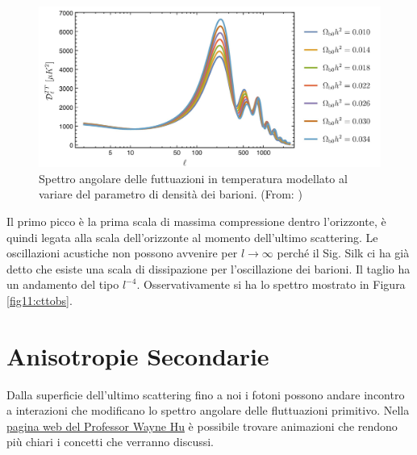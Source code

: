 \begin{figure}[H]
    \centering
    \includegraphics[width=.8 \textwidth]{Pictures/11/angspecmodel.jpg}
    \caption{Spettro angolare delle futtuazioni in temperatura modellato al variare del parametro di densità dei barioni. (From: \cite{Piattella_2018}) }\label{fig11:cttmodelb}
\end{figure}

Il primo picco è la prima scala di massima compressione dentro l'orizzonte, è quindi legata alla scala dell'orizzonte al momento dell'ultimo scattering. Le oscillazioni acustiche non possono avvenire per $l\to \infty$ perché il Sig. Silk ci ha già detto che esiste una scala di dissipazione per l'oscillazione dei barioni. Il taglio ha un andamento del tipo $l^{-4}$. Osservativamente si ha lo spettro mostrato in Figura \ref{fig11:cttobs}.




\section{Anisotropie Secondarie}
Dalla superficie dell'ultimo scattering fino a noi i fotoni possono andare incontro a interazioni che modificano lo spettro angolare delle fluttuazioni primitivo. Nella \href{http://background.uchicago.edu/~whu/intermediate/intermediate.html}{pagina web del Professor Wayne Hu} è possibile trovare animazioni che rendono più chiari i concetti che verranno discussi.

